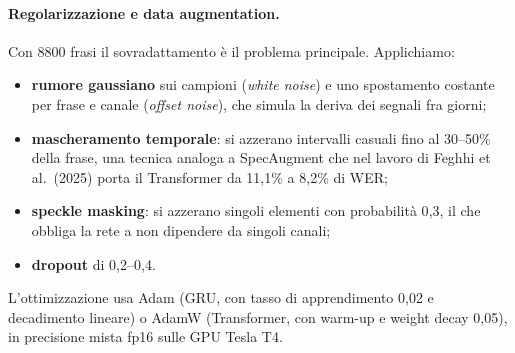 \documentclass[10pt,a4paper]{article}
\begin{document}
\paragraph{Regolarizzazione e data augmentation.} Con 8800 frasi il sovradattamento è il problema principale. Applichiamo:
\begin{itemize}\setlength\itemsep{0pt}
\item \textbf{rumore gaussiano} sui campioni (\emph{white noise}) e uno spostamento costante per frase e canale (\emph{offset noise}), che simula la deriva dei segnali fra giorni;
\item \textbf{mascheramento temporale}: si azzerano intervalli casuali fino al 30--50\% della frase, una tecnica analoga a SpecAugment che nel lavoro di Feghhi et al.\ (2025) porta il Transformer da 11{,}1\% a 8{,}2\% di WER;
\item \textbf{speckle masking}: si azzerano singoli elementi con probabilità 0{,}3, il che obbliga la rete a non dipendere da singoli canali;
\item \textbf{dropout} di 0{,}2--0{,}4.
\end{itemize}
L'ottimizzazione usa Adam (GRU, con tasso di apprendimento 0{,}02 e decadimento lineare) o AdamW (Transformer, con warm-up e weight decay 0{,}05), in precisione mista fp16 sulle GPU Tesla T4.
\end{document}
